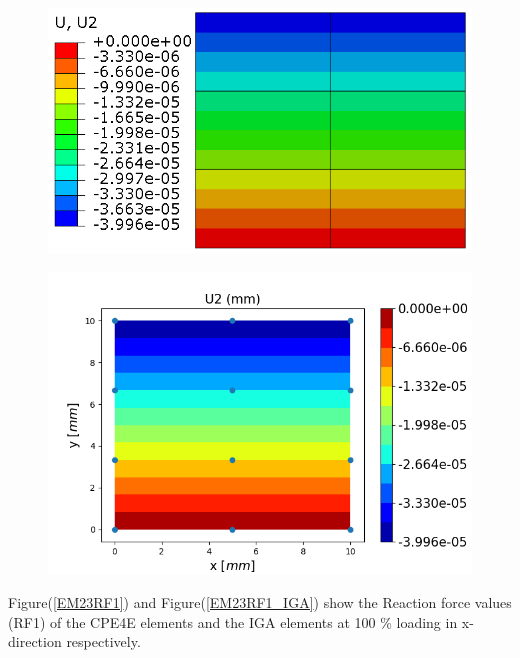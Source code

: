 \documentclass[12pt]{article}
\begin{document}
\begin{figure}[H]
	\centering
	\begin{minipage}{.5\textwidth}
		\centering
		\includegraphics[width=1\linewidth]{EM23U2.png}
		\label{EM23U2}
	\end{minipage}%
	\begin{minipage}{.6\textwidth}
		\centering
		\includegraphics[width=1\linewidth]{EM23U2_IGA.png}
		\label{EM23U2_IGA}
	\end{minipage}
\end{figure}
Figure(\ref{EM23RF1}) and Figure(\ref{EM23RF1_IGA}) show the Reaction force values (RF1) of the CPE4E elements and the IGA elements at 100 \% loading in x-direction respectively. \\
\end{document}
